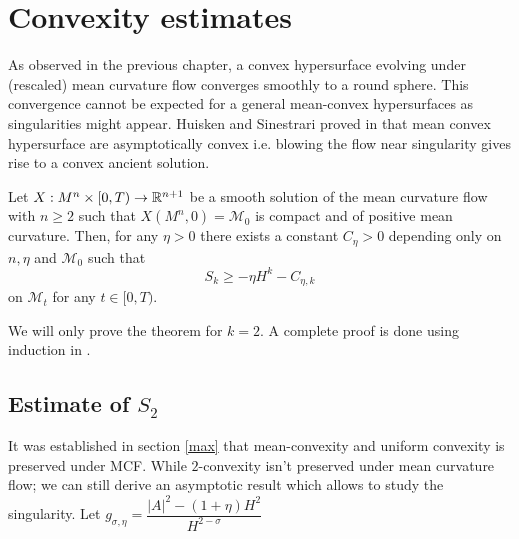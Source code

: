 \chapter{Convexity estimates}

As observed in the previous chapter, a convex hypersurface evolving under (rescaled) mean curvature flow converges smoothly to a round sphere. This convergence cannot be expected for a general mean-convex hypersurfaces as singularities might appear. Huisken and Sinestrari proved in \cite{huisken1999convexity, huisken1999mean} that mean convex hypersurface are asymptotically convex i.e. blowing the flow near singularity gives rise to a convex ancient solution.

\begin{thm}\label{mainthm}
    Let $ X : M^{n} \times [0,T) \to \mathbb{R}^{n+1}$ be a smooth solution of the mean curvature flow with $ n \ge 2 $ such that $ X(M^{n}, 0) = \mathcal{M}_{0} $ is compact and of positive mean curvature. Then, for any $ \eta >0 $ there exists a constant $ C_{\eta} >0 $ depending only on $ n, \eta $ and $ \mathcal{M}_{0} $ such that 
    \begin{equation}
        S_{k} \ge - \eta H^{k} - C_{\eta,k}
    \end{equation}
    on $ \mathcal{M}_{t} $ for any $ t \in [0,T) $.
\end{thm}

We will only prove the theorem for $ k=2 $. A complete proof is done using induction in \cite{huisken1999convexity}. 
\section{Estimate of $S_{2}$}
It was established in section \cref{max} that mean-convexity and uniform convexity is preserved under MCF. While $ 2 $-convexity isn't preserved under mean curvature flow; we can still derive an asymptotic result which allows to study the singularity. %
Let $ g_{\sigma,\eta} = \dfrac{|A|^{2}-(1+\eta)H^{2}}{H^{2-\sigma}} $


